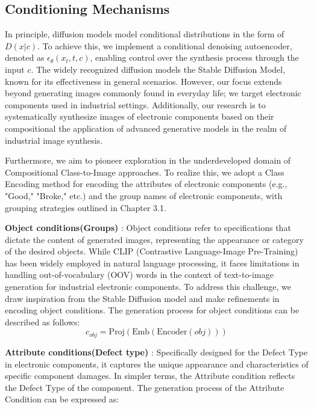 \subsection{Conditioning Mechanisms}
In principle, diffusion models model conditional distributions in the form of \(D(x|c)\). To achieve this, we implement a conditional denoising autoencoder, denoted as \(\epsilon_{\theta}(x_t, t, c)\), enabling control over the synthesis process through the input \(c\). The widely recognized diffusion models the Stable Diffusion Model\cite{Stable_Diffusion}, known for its effectiveness in general scenarios. However, our focus extends beyond generating images commonly found in everyday life; we target electronic components used in industrial settings. Additionally, our research is to systematically synthesize images of electronic components based on their compositional the application of advanced generative models in the realm of industrial image synthesis.

Furthermore, we aim to pioneer exploration in the underdeveloped domain of Compositional Class-to-Image approaches. To realize this, we adopt a Class Encoding method for encoding the attributes of electronic components (e.g., "Good," "Broke," etc.) and the group names of electronic components, with grouping strategies outlined in Chapter 3.1. 

\textbf{Object conditions(Groups)} : Object conditions refer to specifications that dictate the content of generated images, representing the appearance or category of the desired objects. While CLIP (Contrastive Language-Image Pre-Training)\cite{CLIP} has been widely employed in natural language processing, it faces limitations in handling out-of-vocabulary (OOV) words in the context of text-to-image generation for industrial electronic components. To address this challenge, we draw inspiration from the Stable Diffusion model and make refinements in encoding object conditions. The generation process for object conditions can be described as follows:
\begin{equation}
c_{obj} = \text{Proj}(\text{Emb}(\text{Encoder}(obj)))
\end{equation}

\textbf{Attribute conditions(Defect type)} : Specifically designed for the Defect Type in electronic components, it captures the unique appearance and characteristics of specific component damages. In simpler terms, the Attribute condition reflects the Defect Type of the component. The generation process of the Attribute Condition can be expressed as:

